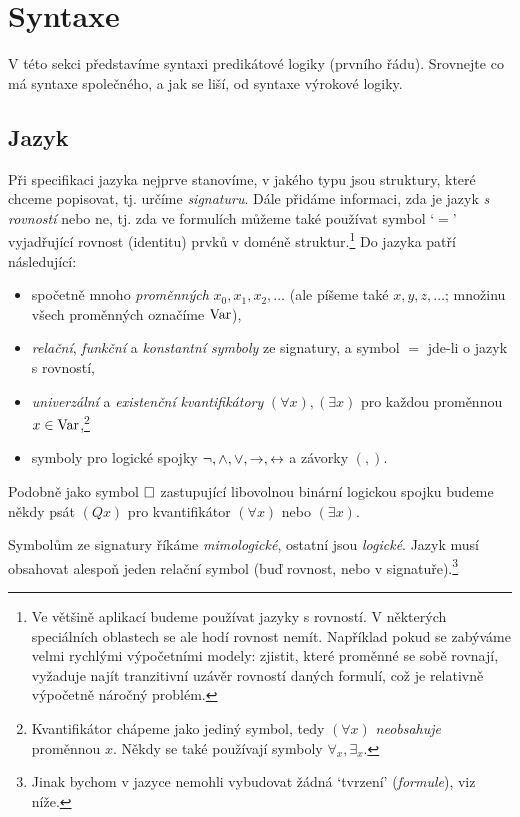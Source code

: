\section{Syntaxe}

V této sekci představíme syntaxi predikátové logiky (prvního řádu). Srovnejte co má syntaxe společného, a jak se liší, od syntaxe výrokové logiky.


\subsection{Jazyk}

Při specifikaci jazyka nejprve stanovíme, v jakého typu jsou struktury, které chceme popisovat, tj. určíme \emph{signaturu}. Dále přidáme informaci, zda je jazyk \emph{s rovností} nebo ne, tj. zda ve formulích můžeme také používat symbol `$=$' vyjadřující rovnost (identitu) prvků v doméně struktur.\footnote{Ve většině aplikací budeme používat jazyky s rovností. V některých speciálních oblastech se ale hodí rovnost nemít. Například pokud se zabýváme velmi rychlými výpočetními modely: zjistit, které proměnné se sobě rovnají, vyžaduje najít tranzitivní uzávěr rovností daných formulí, což je relativně výpočetně náročný problém.} Do jazyka patří následující:
\begin{itemize}
    \item spočetně mnoho \emph{proměnných} $x_0,x_1,x_2,\dots$ (ale píšeme také $x,y,z,\dots$; množinu všech proměnných označíme $\operatorname{Var}$),
    \item \emph{relační}, \emph{funkční} a \emph{konstantní symboly} ze signatury, a symbol $=$ jde-li o jazyk s rovností,
    \item \emph{univerzální} a \emph{existenční} \emph{kvantifikátory} $(\forall x),(\exists x)$ pro každou proměnnou $x\in\operatorname{Var}$,\footnote{Kvantifikátor chápeme jako jediný symbol, tedy $(\forall x)$ \emph{neobsahuje} proměnnou $x$. Někdy se také používají symboly $\forall_x,\exists_x$.}
    \item symboly pro logické spojky \( \neg,{\land},{\lor}, {\mathbin{\rightarrow}}, {\mathbin{\leftrightarrow}} \) a závorky \( (,) \).
\end{itemize}
Podobně jako symbol ${\mathbin{\square}}$ zastupující libovolnou binární logickou spojku budeme někdy psát $(Qx)$ pro kvantifikátor $(\forall x)$ nebo $(\exists x)$.

Symbolům ze signatury říkáme \emph{mimologické}, ostatní jsou \emph{logické}. Jazyk musí obsahovat alespoň jeden relační symbol (buď rovnost, nebo v signatuře).\footnote{Jinak bychom v jazyce nemohli vybudovat žádná `tvrzení' (\emph{formule}), viz níže.}


